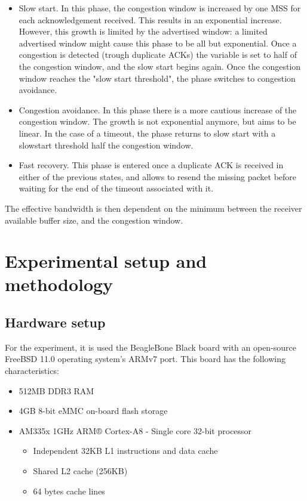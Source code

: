 \documentclass[a4paper,10pt]{article}
\begin{document}
\begin{itemize}
   \item Slow start. In this phase, the congestion window is increased by one MSS for each acknowledgement received. This results in an exponential increase. However, this growth is limited by the advertised window: a limited advertised window might cause this phase to be all but exponential. Once a congestion is detected (trough duplicate ACKs) the variable  is set to half of the congestion window, and the slow start begins again. Once the congestion window reaches the "slow start threshold", the phase switches to congestion avoidance.
   \item Congestion avoidance. In this phase there is a more cautious increase of the congestion window. The growth is not exponential anymore, but aims to be linear. In the case of a timeout, the phase returns to slow start with a slowstart threshold half the congestion window.
   \item Fast recovery. This phase is entered once a duplicate ACK is received in either of the previous states, and allows to resend the missing packet before waiting for the end of the timeout associated with it.
\end{itemize}
The effective bandwidth is then dependent on the minimum between the receiver available buffer size, and the congestion window.

\section{Experimental setup and methodology}

\subsection{Hardware setup}

For the experiment, it is used the BeagleBone Black board with an open-source FreeBSD\cite{mckusick_design_2014} 11.0 operating system’s ARMv7 port. This board has the following characteristics:
\begin{itemize}
    \item 512MB DDR3 RAM
    \item 4GB 8-bit eMMC on-board flash storage
    \item AM335x 1GHz ARM® Cortex-A8 - Single core 32-bit processor\cite{noauthor_am3358_nodate}
    \begin{itemize}
        \item Independent 32KB L1 instructions and data cache
        \item Shared L2 cache (256KB)
        \item 64 bytes cache lines
    \end{itemize}
\end{itemize}
\end{document}
